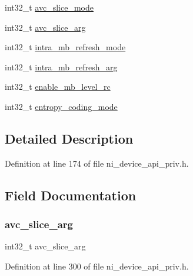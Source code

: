 \begin{DoxyCompactItemize}
int32\+\_\+t \mbox{\hyperlink{struct__ni__t408__config__t_a8f1cdf2e9bf2711ba8642a121bc9cf3d}{avc\+\_\+slice\+\_\+mode}}
\item 
int32\+\_\+t \mbox{\hyperlink{struct__ni__t408__config__t_a17de561658b01c662cbcaea88c6a82ed}{avc\+\_\+slice\+\_\+arg}}
\item 
int32\+\_\+t \mbox{\hyperlink{struct__ni__t408__config__t_a3058fa56db32c1a7a7377990f8a4f01a}{intra\+\_\+mb\+\_\+refresh\+\_\+mode}}
\item 
int32\+\_\+t \mbox{\hyperlink{struct__ni__t408__config__t_a27c3ff3e227e59b5181591d130483a78}{intra\+\_\+mb\+\_\+refresh\+\_\+arg}}
\item 
int32\+\_\+t \mbox{\hyperlink{struct__ni__t408__config__t_a57131cce98a9fb62607169c22c2ad986}{enable\+\_\+mb\+\_\+level\+\_\+rc}}
\item 
int32\+\_\+t \mbox{\hyperlink{struct__ni__t408__config__t_a9bff635a96d4be296181ed1bd611b683}{entropy\+\_\+coding\+\_\+mode}}
\end{DoxyCompactItemize}


\subsection{Detailed Description}


Definition at line 174 of file ni\+\_\+device\+\_\+api\+\_\+priv.\+h.



\subsection{Field Documentation}
\mbox{\label{struct__ni__t408__config__t_a17de561658b01c662cbcaea88c6a82ed}} 
\subsubsection{\texorpdfstring{avc\_slice\_arg}{avc\_slice\_arg}}
{\footnotesize\ttfamily int32\+\_\+t avc\+\_\+slice\+\_\+arg}



Definition at line 300 of file ni\+\_\+device\+\_\+api\+\_\+priv.\+h.

\mbox{\label{struct__ni__t408__config__t_a8f1cdf2e9bf2711ba8642a121bc9cf3d}} 

